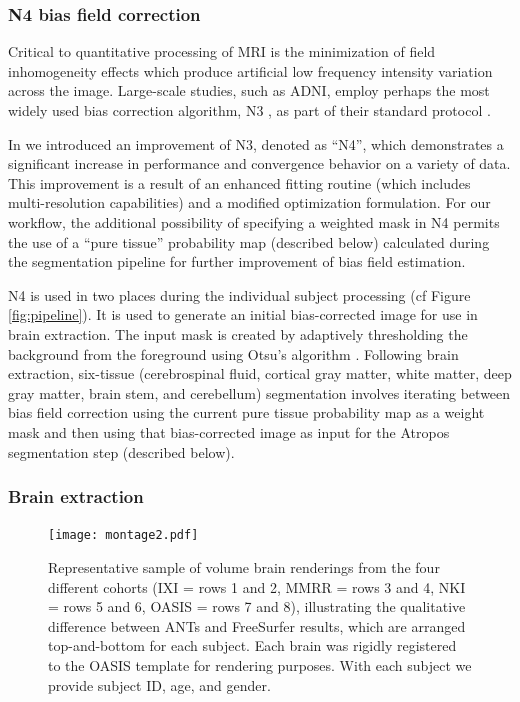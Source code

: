 \subsubsection{N4 bias field correction}

Critical to quantitative processing of MRI is the minimization of
field inhomogeneity effects which produce artificial low frequency 
intensity variation across the image.  Large-scale studies, such
as ADNI, employ
perhaps the most widely used bias correction algorithm, N3 \citep{sled1998}, 
as part of their standard protocol \citep{boyes2008}.

In \cite{tustison2010} we introduced an improvement of N3, denoted as
``N4'', which demonstrates a significant increase in performance and convergence behavior on a variety of data. 
This improvement is a result of an enhanced
fitting routine (which includes multi-resolution capabilities) and a modified optimization 
formulation.  For our workflow, the additional possibility of specifying
a weighted mask in N4 permits the use of a ``pure tissue'' probability map 
(described below)
calculated during the segmentation pipeline for further improvement of 
bias field estimation.  

N4 is used in two places during the individual subject processing (cf Figure
\ref{fig:pipeline}).  
It is used to generate an initial bias-corrected image for use in
brain extraction.  The input mask is created by adaptively thresholding 
the background from the foreground using Otsu's algorithm \citep{otsu1979}.
Following brain extraction, six-tissue (cerebrospinal fluid, cortical gray 
matter, white matter, deep gray matter, brain stem, and cerebellum)
segmentation involves iterating
between bias field correction using the current pure tissue 
probability map as a weight mask and then using that bias-corrected image
as input for the Atropos segmentation step (described below).

\subsubsection{Brain extraction}

\begin{figure}
  \texttt{[image: montage2.pdf]}
  \caption{Representative sample of volume brain renderings from the four
  different cohorts (IXI = rows 1 and 2, MMRR = rows 3 and 4, 
  NKI = rows 5 and 6, OASIS = rows 7 and 8),
  illustrating the qualitative difference between ANTs and FreeSurfer 
  results, which are arranged top-and-bottom for each subject.  Each brain was rigidly
  registered to the OASIS template for rendering purposes.  With each subject
  we provide subject ID, age, and gender.
  }
  \label{fig:brainExtraction}
\end{figure}

